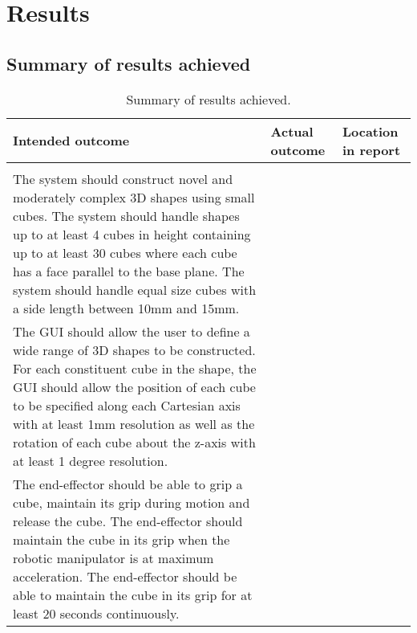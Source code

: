 
\section{Results}

\subsection{Summary of results achieved}

\begin{table}[H]
	\renewcommand{\arraystretch}{1.3}
	\centering
	\begin{tabular}{|>{\raggedright}m{6.5cm}|>{\raggedright}m{5cm}|>{\raggedright\arraybackslash}m{3cm}|}
		\hline
		\textbf{Intended outcome} & \textbf{Actual outcome} & \textbf{Location in report} \\
		\hline
		\multicolumn{3}{|l|}{\textbf{Core mission requirements and specifications}} \\
		\hline
		The system should construct novel and moderately complex 3D shapes using small cubes. The system should handle shapes up to at least 4 cubes in height containing up to at least 30 cubes where each cube has a face parallel to the base plane. The system should handle equal size cubes with a side length between 10mm and 15mm. & & \\
		\hline
		The GUI should allow the user to define a wide range of 3D shapes to be constructed. For each constituent cube in the shape, the GUI should allow the position of each cube to be specified along each Cartesian axis with at least 1mm resolution as well as the rotation of each cube about the z-axis with at least 1 degree resolution. & & \\
		\hline
		The end-effector should be able to grip a cube, maintain its grip during motion and release the cube. The end-effector should maintain the cube in its grip when the robotic manipulator is at maximum acceleration. The end-effector should be able to maintain the cube in its grip for at least 20 seconds continuously. &  & \\
		\hline
	\end{tabular}
	\caption{\label{tab:results_summary_p1}Summary of results achieved.}
\end{table}

